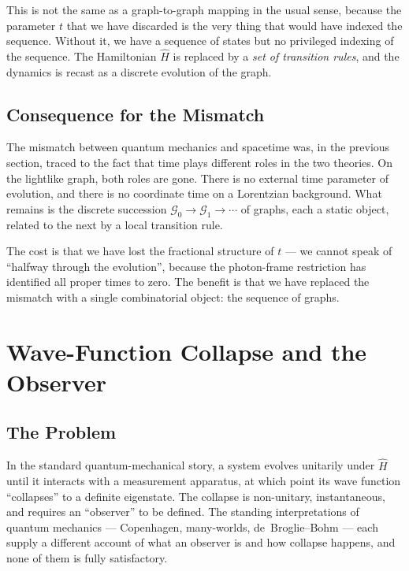 \documentclass[11pt]{article}
\begin{document}
This is not the same as a graph-to-graph mapping in the usual sense, because the parameter $t$ that we have discarded is the very thing that would have indexed the sequence. Without it, we have a sequence of states but no privileged indexing of the sequence. The Hamiltonian $\hat{H}$ is replaced by a \emph{set of transition rules}, and the dynamics is recast as a discrete evolution of the graph.

\subsection{Consequence for the Mismatch}

The mismatch between quantum mechanics and spacetime was, in the previous section, traced to the fact that time plays different roles in the two theories. On the lightlike graph, both roles are gone. There is no external time parameter of evolution, and there is no coordinate time on a Lorentzian background. What remains is the discrete succession $\mathcal{G}_0 \to \mathcal{G}_1 \to \cdots$ of graphs, each a static object, related to the next by a local transition rule.

The cost is that we have lost the fractional structure of $t$ --- we cannot speak of ``halfway through the evolution'', because the photon-frame restriction has identified all proper times to zero. The benefit is that we have replaced the mismatch with a single combinatorial object: the sequence of graphs.

\section{Wave-Function Collapse and the Observer}
\label{sec:collapse}

\subsection{The Problem}

In the standard quantum-mechanical story, a system evolves unitarily under $\hat{H}$ until it interacts with a measurement apparatus, at which point its wave function ``collapses'' to a definite eigenstate. The collapse is non-unitary, instantaneous, and requires an ``observer'' to be defined. The standing interpretations of quantum mechanics --- Copenhagen, many-worlds, de~Broglie--Bohm --- each supply a different account of what an observer is and how collapse happens, and none of them is fully satisfactory.
\end{document}
